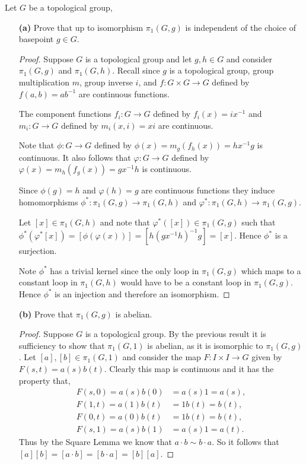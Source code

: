 \documentclass{homework651}
\begin{document}
\begin{problems}

\problem Let $G$ be a topological group, 
\begin{enumerate}
    \item[\textbf{(a)}] Prove that up to isomorphism $\pi_1(G, g)$ is independent of the choice of basepoint $g \in G$.
    \begin{proof} Suppose $G$ is a topological group and let $g, h \in G$ and consider $\pi_1(G, g)$ and $\pi_1(G, h)$. Recall since $g$ is a topological group, group multiplication $m$, group inverse $i$, and $f: G \times G \to G$ defined by $f(a, b) = ab^{-1}$ are continuous functions. 
        
        The component functions $f_i: G \to G$ defined by $f_i(x) = ix^{-1}$ and $m_i: G \to G$ defined by $m_i(x, i) = xi$ are continuous. 
        
        Note that $\phi: G \to G$ defined by $\phi(x) = m_g(f_h(x)) = hx^{-1}g$ is continuous. It also follows that $\varphi: G \to G$ defined by $\varphi(x) = m_h(f_g(x)) = gx^{-1}h$ is continuous. 
        
        Since $\phi(g) = h$ and $\varphi(h) = g$ are continuous functions they induce homomorphisms $\phi^*: \pi_1(G, g) \to \pi_1(G, h)$ and $\varphi^*: \pi_1(G, h) \to \pi_1(G, g)$. 
        
        Let $[x] \in \pi_1(G, h)$ and note that $\varphi^*([x]) \in \pi_1(G, g)$ such that $\phi^*(\varphi^*[x]) = [\phi(\varphi(x))] = [h(gx^{-1}h)^{-1}g] = [x]$. Hence $\phi^*$ is a surjection. 
        
        Note $\phi^*$ has a trivial kernel since the only loop in $\pi_1(G, g)$ which maps to a constant loop in $\pi_1(G, h)$ would have to be a constant loop in $\pi_1(G, g)$. Hence $\phi^*$ is an injection and therefore an isomorphism. 
    \end{proof}
    \item[\textbf{(b)}] Prove that $\pi_1(G, g)$ is abelian. 
    \begin{proof} Suppose $G$ is a topological group. By the previous result it is sufficiency to show that $\pi_1(G, 1)$ is abelian, as it is isomorphic to $\pi_1(G, g)$. Let $[a],[b] \in \pi_1(G, 1)$ and consider the map $F: I \times I \to G$ given by $F(s, t) = a(s)b(t)$. Clearly this map is continuous and it has the property that,
     \begin{align*}
        F(s, 0) = a(s)b(0) &= a(s)1 = a(s),\\
        F(1, t) = a(1)b(t) &= 1b(t) = b(t),\\
        F(0, t) = a(0)b(t) &= 1b(t) = b(t),\\
        F(s, 1) = a(s)b(1) &= a(s)1 = a(t).
    \end{align*}
    Thus by the Square Lemma we know that $a \cdot b \sim b \cdot a$. So it follows that $[a][b] = [a\cdot b] = [b\cdot a] = [b][a]$.         
    \end{proof}
\end{enumerate}




\end{problems}
\end{document}
